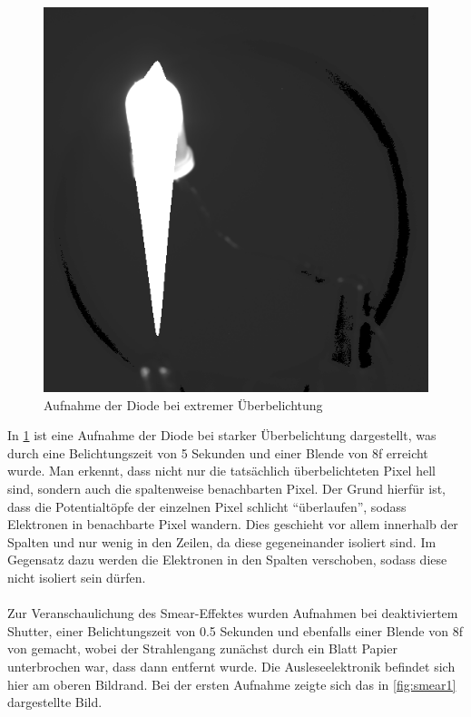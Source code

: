 \begin{figure}[h!]
\centering
        \includegraphics[width=.4\textwidth]{blooming.png}
\caption{ Aufnahme der Diode bei extremer Überbelichtung }
\label{fig:blooming}
\end{figure}
In \ref{fig:blooming} ist eine Aufnahme der Diode bei starker Überbelichtung dargestellt, was durch eine Belichtungszeit von 5 Sekunden und einer Blende von 8f erreicht wurde. Man erkennt, dass nicht nur die tatsächlich überbelichteten Pixel hell sind, sondern auch die spaltenweise benachbarten Pixel. Der Grund hierfür ist, dass die Potentialtöpfe der einzelnen Pixel schlicht \enquote{überlaufen}, sodass Elektronen in benachbarte Pixel wandern. Dies geschieht vor allem innerhalb der Spalten und nur wenig in den Zeilen, da diese gegeneinander isoliert sind. Im Gegensatz dazu werden die Elektronen in den Spalten verschoben, sodass diese nicht isoliert sein dürfen. \\ \\
Zur Veranschaulichung des Smear-Effektes wurden Aufnahmen bei deaktiviertem Shutter, einer Belichtungszeit von 0.5 Sekunden und ebenfalls einer Blende von 8f von gemacht, wobei der Strahlengang zunächst durch ein Blatt Papier unterbrochen war, dass dann entfernt wurde. Die Ausleseelektronik befindet sich hier am oberen Bildrand. 
Bei der ersten Aufnahme zeigte sich das in \ref{fig:smear1} dargestellte Bild. 

